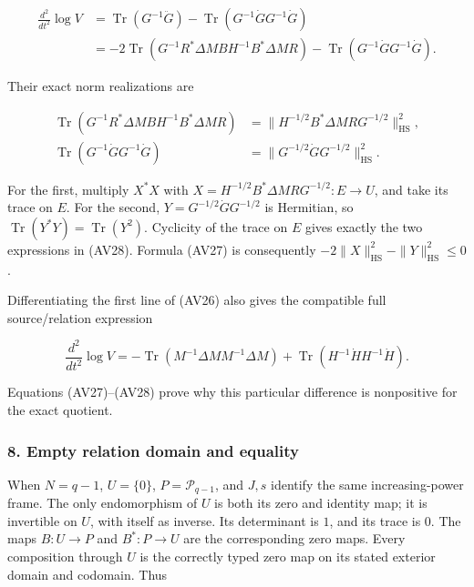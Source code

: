 \documentclass{article}
\begin{document}
\[
\begin{aligned}
\frac{d^2}{dt^2}\log V
&=\operatorname{Tr}(G^{-1}\ddot G)
-\operatorname{Tr}(G^{-1}\dot G G^{-1}\dot G)\\
&=-2\operatorname{Tr}(G^{-1}R^*\Delta M BH^{-1}B^*\Delta M R)
-\operatorname{Tr}(G^{-1}\dot G G^{-1}\dot G).
\end{aligned}
\tag{AV27}
\]

Their exact norm realizations are

\[
\begin{aligned}
\operatorname{Tr}(G^{-1}R^*\Delta M BH^{-1}B^*\Delta M R)
&=\|H^{-1/2}B^*\Delta M RG^{-1/2}\|_{\mathrm{HS}}^2,\\
\operatorname{Tr}(G^{-1}\dot G G^{-1}\dot G)
&=\|G^{-1/2}\dot G G^{-1/2}\|_{\mathrm{HS}}^2.
\end{aligned}
\tag{AV28}
\]

For the first, multiply \(X^*X\) with \(X=H^{-1/2}B^*\Delta M RG^{-1/2}:E\to U\), and take its trace on \(E\). For the second, \(Y=G^{-1/2}\dot G G^{-1/2}\) is Hermitian, so \(\operatorname{Tr}(Y^*Y)=\operatorname{Tr}(Y^2)\). Cyclicity of the trace on \(E\) gives exactly the two expressions in (AV28). Formula (AV27) is consequently \(-2\|X\|_{\mathrm{HS}}^2-\|Y\|_{\mathrm{HS}}^2\le0\).

Differentiating the first line of (AV26) also gives the compatible full source/relation expression

\[
\frac{d^2}{dt^2}\log V
=-\operatorname{Tr}(M^{-1}\Delta M M^{-1}\Delta M)
+\operatorname{Tr}(H^{-1}\dot H H^{-1}\dot H).
\tag{AV29}
\]

Equations (AV27)--(AV28) prove why this particular difference is nonpositive for the exact quotient.

\subsubsection{8. Empty relation domain and equality}\label{endpoint-variation_review--empty-relation-domain-and-equality}

When \(N=q-1\), \(U=\{0\}\), \(P=\mathcal P_{q-1}\), and \(J,s\) identify the same increasing-power frame. The only endomorphism of \(U\) is both its zero and identity map; it is invertible on \(U\), with itself as inverse. Its determinant is \(1\), and its trace is \(0\). The maps \(B:U\to P\) and \(B^*:P\to U\) are the corresponding zero maps. Every composition through \(U\) is the correctly typed zero map on its stated exterior domain and codomain. Thus
\end{document}
